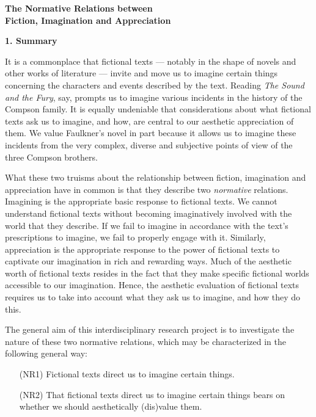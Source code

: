 \begin{center}
\noindent\textbf{\large The Normative Relations between\\ Fiction, Imagination and
Appreciation}
\end{center}


\noindent\textbf{\large 1. Summary}
\vspace{.1cm}

\noindent It is a commonplace that fictional texts --- notably in the shape of novels and other works of literature --- invite and move us to imagine certain things concerning the characters and events described by the text. Reading \emph{The Sound and the Fury}, say, prompts us to imagine various incidents in the history of the Compson family. It is equally undeniable that considerations about what fictional texts ask us to imagine, and how, are central to our aesthetic appreciation of them. We value Faulkner's novel in part because it allows us to imagine these incidents from the very complex, diverse and subjective points of view of the three Compson brothers.

What these two truisms about the relationship between fiction, imagination and appreciation have in common is that they describe two \emph{normative} relations. Imagining is the appropriate basic response to fictional texts. We cannot understand fictional texts without becoming imaginatively involved with the world that they describe. If we fail to imagine in accordance with the text's prescriptions to imagine, we fail to properly engage with it. Similarly, appreciation is the appropriate response to the power of fictional texts to captivate our imagination in rich and rewarding ways. Much of the aesthetic worth of fictional texts resides in the fact that they make specific fictional worlds accessible to our imagination. Hence, the aesthetic evaluation of fictional texts requires us to take into account what they ask us to imagine, and how they do this.

The general aim of this interdisciplinary research project is to investigate the nature of these two normative relations, which may be characterized in the following general way:


\vspace{-.1cm}
\begin{itemize}[leftmargin=2cm]
\item[{(NR1)}] Fictional texts direct us to imagine certain things.
\vspace{-.2cm}
\item[{(NR2)}] That fictional texts direct us to imagine certain things bears on whether we should aesthetically (dis)value them. 
\end{itemize}
\vspace{-.1cm}


